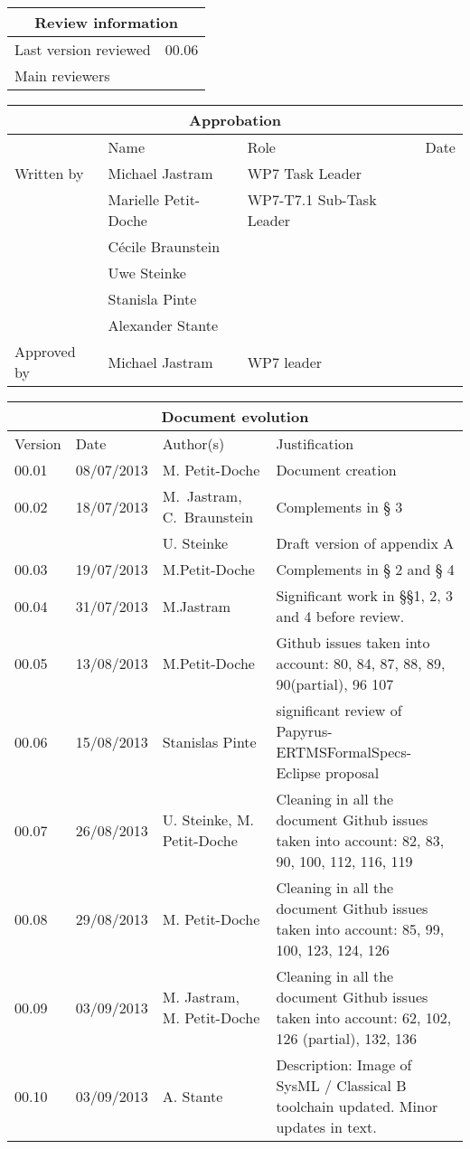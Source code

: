 \documentclass{template/openetcs_report}
\begin{document}
\begin{tabular}{|p{4.4cm}|p{8.7cm}|}
\hline
\multicolumn{2}{|c|}{Review information} \\
\hline
Last version reviewed & 00.06 \\
\hline
Main reviewers &  \\
\hline
\end{tabular}

\begin{tabular}{|p{2.2cm}|p{4cm}|p{4cm}|p{2cm}|}
\hline
\multicolumn{4}{|c|}{Approbation} \\
\hline
  &  Name & Role & Date   \\
\hline  
Written by  & Michael Jastram & WP7 Task Leader  &  \\
&  Marielle Petit-Doche & WP7-T7.1 Sub-Task Leader  & \\
& Cécile Braunstein & &  \\
& Uwe Steinke & &  \\
& Stanisla Pinte & &  \\
& Alexander Stante & &  \\
\hline
Approved by & Michael Jastram & WP7 leader & \\
\hline
\end{tabular}

\begin{tabular}{|p{2.2cm}|p{2cm}|p{3cm}|p{5cm}|}
\hline
\multicolumn{4}{|c|}{Document evolution} \\
\hline
Version &  Date & Author(s) & Justification  \\
\hline  
00.01 & 08/07/2013 & M. Petit-Doche &  Document creation  \\
00.02 & 18/07/2013 & M.~Jastram, C.~Braunstein & Complements in § 3 \\
 &  & U. Steinke & Draft version of appendix A \\
00.03 & 19/07/2013 & M.Petit-Doche & Complements in § 2 and § 4 \\
00.04 & 31/07/2013 & M.Jastram & Significant work in §§1, 2, 3 and 4 before review. \\
00.05 & 13/08/2013 & M.Petit-Doche & Github issues taken into account: 80, 84, 87, 88, 89, 90(partial), 96 107 \\
00.06 & 15/08/2013 & Stanislas Pinte & significant review of Papyrus-ERTMSFormalSpecs-Eclipse proposal \\
00.07 & 26/08/2013 & U. Steinke, M. Petit-Doche & Cleaning in all the document Github issues taken into account: 82, 83, 90, 100, 112, 116, 119 \\
00.08 & 29/08/2013 &  M. Petit-Doche & Cleaning in all the document Github issues taken into account: 85, 99, 100, 123, 124, 126 \\
00.09 & 03/09/2013 & M. Jastram,  M. Petit-Doche & Cleaning in all the document Github issues taken into account: 62, 102, 126 (partial), 132, 136 \\
00.10 & 03/09/2013 & A. Stante & Description: Image of SysML / Classical B toolchain updated. Minor updates in text. \\
\hline  
\end{tabular}
\end{document}
